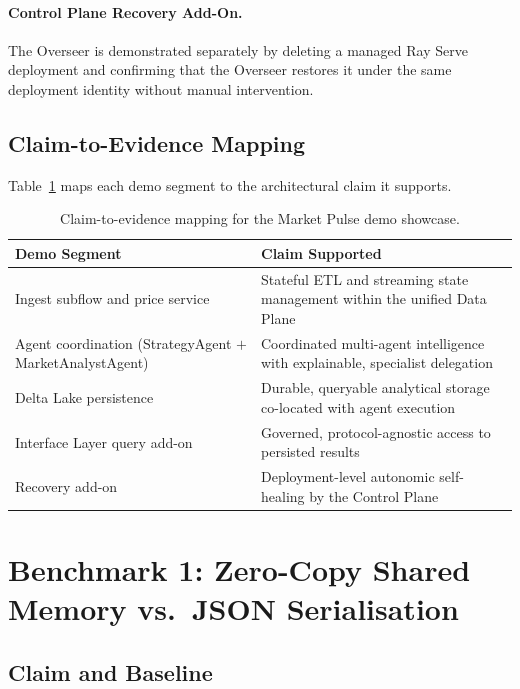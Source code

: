 \documentclass[12pt, a4paper]{report}
\begin{document}
\paragraph{Control Plane Recovery Add-On.}
The Overseer is demonstrated separately by deleting a managed Ray Serve deployment and
confirming that the Overseer restores it under the same deployment identity without
manual intervention.

\subsection{Claim-to-Evidence Mapping}
\label{ssec:demo_claims}

Table~\ref{tab:demo_claims} maps each demo segment to the architectural claim it
supports.

\begin{table}[H]
  \centering
  \caption{Claim-to-evidence mapping for the Market Pulse demo showcase.}
  \label{tab:demo_claims}
  \begin{tabularx}{\textwidth}{lX}
    \toprule
    \textbf{Demo Segment} & \textbf{Claim Supported} \\
    \midrule
    Ingest subflow and price service &
    Stateful ETL and streaming state management within the unified Data Plane \\
    \addlinespace
    Agent coordination (StrategyAgent $+$ MarketAnalystAgent) &
    Coordinated multi-agent intelligence with explainable, specialist delegation \\
    \addlinespace
    Delta Lake persistence &
    Durable, queryable analytical storage co-located with agent execution \\
    \addlinespace
    Interface Layer query add-on &
    Governed, protocol-agnostic access to persisted results \\
    \addlinespace
    Recovery add-on &
    Deployment-level autonomic self-healing by the Control Plane \\
    \bottomrule
  \end{tabularx}
\end{table}

\section{Benchmark 1: Zero-Copy Shared Memory vs.\ JSON Serialisation}
\label{sec:exp_zerocopy}

\subsection{Claim and Baseline}
\label{ssec:exp1_claim}
\end{document}
